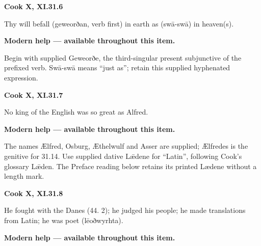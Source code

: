 \par\begin{minipage}{\linewidth}\raggedright
\textbf{Cook X, XI.31.6}

Thy will befall (geweorðan, verb first) in earth as (swā-swā) in heaven(s).

\textbf{Modern help — available throughout this item.}

\end{minipage}\par\addvspace{4pt}

Begin with supplied Geweorðe, the third-singular present subjunctive of the prefixed verb. Swā-swā means “just as”; retain this supplied hyphenated expression.

\par\begin{minipage}{\linewidth}\raggedright
\textbf{Cook X, XI.31.7}

No king of the English was so great as Alfred.

\textbf{Modern help — available throughout this item.}

\end{minipage}\par\addvspace{4pt}

The names Ælfred, Osburg, Æthelwulf and Asser are supplied; Ælfredes is the genitive for 31.14. Use supplied dative Lǣdene for “Latin”, following Cook’s glossary Lǣden. The Preface reading below retains its printed Lædene without a length mark.

\par\begin{minipage}{\linewidth}\raggedright
\textbf{Cook X, XI.31.8}

He fought with the Danes (44. 2); he judged his people; he made translations from Latin; he was poet (lēoðwyrhta).

\textbf{Modern help — available throughout this item.}

\end{minipage}\par\addvspace{4pt}

